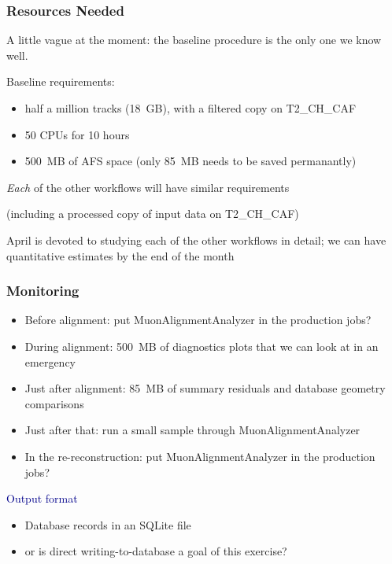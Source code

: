 \documentclass[compress]{beamer}
\begin{document}
\begin{frame}
\frametitle{Resources Needed}

A little vague at the moment: the baseline procedure is the only one we know well.

\vfill
Baseline requirements:
\begin{itemize}
\item half a million tracks (18~GB), with a filtered copy on T2\_CH\_CAF
\item 50 CPUs for 10 hours
\item 500~MB of AFS space (only 85~MB needs to be saved permanantly)
\end{itemize}

\vfill
{\it Each} of the other workflows will have similar requirements

(including a processed copy of input data on T2\_CH\_CAF)

\vfill
April is devoted to studying each of the other workflows in detail; we
can have quantitative estimates by the end of the month
\end{frame}

\begin{frame}
\frametitle{Monitoring}

\begin{itemize}\setlength{\itemsep}{0.25 cm}
\item Before alignment: put MuonAlignmentAnalyzer in the production jobs?
\item During alignment: 500~MB of diagnostics plots that we can look at in an emergency
\item Just after alignment: 85~MB of summary residuals and database geometry comparisons
\item Just after that: run a small sample through MuonAlignmentAnalyzer
\item In the re-reconstruction: put MuonAlignmentAnalyzer in the production jobs?
\end{itemize}

\vfill
\hspace{-0.83 cm} \textcolor{darkblue}{\Large Output format}

\vfill
\begin{itemize}\setlength{\itemsep}{0.25 cm}
\item Database records in an SQLite file
\item or is direct writing-to-database a goal of this exercise?
\end{itemize}
\end{frame}
\end{document}
